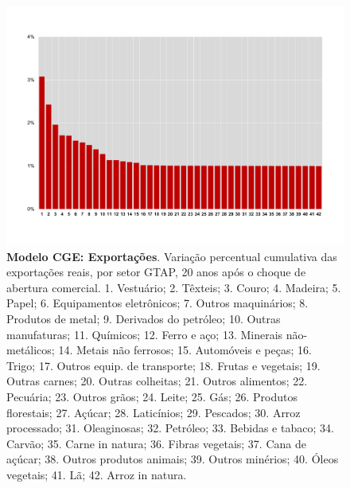 \documentclass{article}
\begin{document}
\begin{landscape}
\begin{figure}[htbp]
    \centering
    \includegraphics[scale=0.8]{mod_estatico_exp.pdf}
    \caption[Modelo CGE: Exportações]{\textbf{Modelo CGE: Exportações}. Variação percentual cumulativa das exportações reais, por setor GTAP, 20 anos após o choque de abertura comercial. \scriptsize{1. Vestuário; 2. Têxteis; 3. Couro; 4. Madeira; 5. Papel; 6. Equipamentos eletrônicos; 7. Outros maquinários; 8. Produtos de metal; 9. Derivados do petróleo; 10. Outras manufaturas; 11. Químicos; 12. Ferro e aço; 13. Minerais não-metálicos; 14. Metais não ferrosos; 15. Automóveis e peças; 16. Trigo; 17. Outros equip. de transporte; 18. Frutas e vegetais; 19. Outras carnes; 20. Outras colheitas; 21. Outros alimentos; 22. Pecuária; 23. Outros grãos; 24. Leite; 25. Gás; 26. Produtos florestais; 27. Açúcar; 28. Laticínios; 29. Pescados; 30. Arroz processado; 31. Oleaginosas; 32. Petróleo; 33. Bebidas e tabaco; 34. Carvão; 35. Carne in natura; 36. Fibras vegetais; 37. Cana de açúcar; 38. Outros produtos animais; 39. Outros minérios; 40. Óleos vegetais; 41. Lã; 42. Arroz in natura. }}
    \label{fig:mod_estatico_exp}
\end{figure}
\end{landscape}
\newpage
\end{document}
